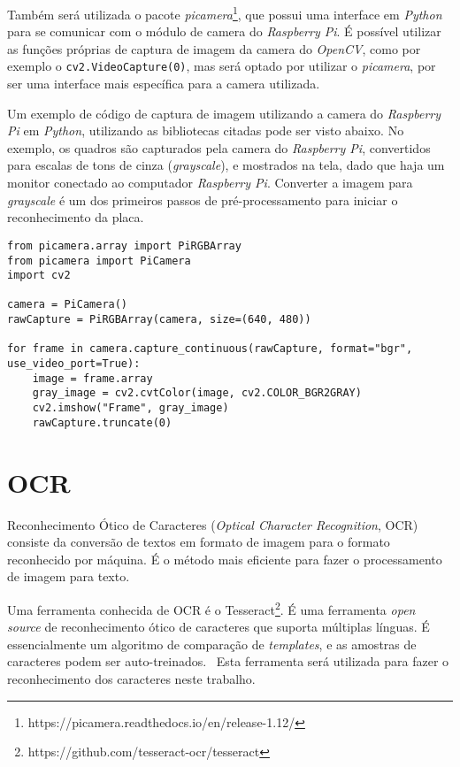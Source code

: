 Também será utilizada o pacote \emph{picamera}\footnote{https://picamera.readthedocs.io/en/release-1.12/},
que possui uma interface em \emph{Python} para se comunicar com o módulo de camera do \emph{Raspberry Pi}.
É possível utilizar as funções próprias de captura de imagem da camera do \emph{OpenCV}, como por exemplo
o \texttt{cv2.VideoCapture(0)}, mas será optado por utilizar o \emph{picamera}, por ser uma interface mais
específica para a camera utilizada.

Um exemplo de código de captura de imagem utilizando a camera do \emph{Raspberry Pi} em \emph{Python}, utilizando
as bibliotecas citadas pode ser visto abaixo. No exemplo, os quadros são capturados pela camera do \emph{Raspberry Pi},
convertidos para escalas de tons de cinza (\emph{grayscale}), e mostrados na tela, dado que haja um monitor conectado ao
computador \emph{Raspberry Pi}. Converter a imagem para \emph{grayscale} é um dos primeiros passos de pré-processamento
para iniciar o reconhecimento da placa.

\begin{verbatim}
from picamera.array import PiRGBArray
from picamera import PiCamera
import cv2

camera = PiCamera()
rawCapture = PiRGBArray(camera, size=(640, 480))

for frame in camera.capture_continuous(rawCapture, format="bgr", use_video_port=True):
	image = frame.array
	gray_image = cv2.cvtColor(image, cv2.COLOR_BGR2GRAY)
	cv2.imshow("Frame", gray_image)
	rawCapture.truncate(0)
\end{verbatim}


\section{OCR}
\label{sec:ocr}

Reconhecimento Ótico de Caracteres (\emph{Optical Character Recognition}, OCR)
consiste da conversão de textos em formato de imagem para o formato reconhecido
por máquina. É o método mais eficiente para fazer o processamento de imagem para
texto.~\cite{mohit2015designing}

Uma ferramenta conhecida de OCR é o
Tesseract\footnote{https://github.com/tesseract-ocr/tesseract}. É uma ferramenta
\emph{open source} de reconhecimento ótico de caracteres que suporta múltiplas
línguas.  É essencialmente um algoritmo de comparação de \emph{templates}, e as
amostras de caracteres podem ser auto-treinados.~\cite{ho2016intelligent} Esta
ferramenta será utilizada para fazer o reconhecimento dos caracteres neste trabalho.

